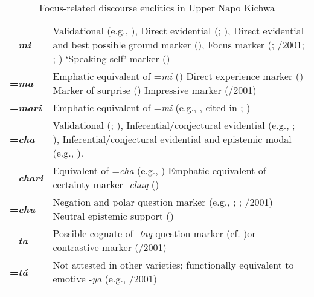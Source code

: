 \documentclass[output=paper]{langscibook}
\begin{document}
\begin{table}
\centering
\begin{tabularx}{\textwidth}{lQ}
\lsptoprule
\textbf{=\textit{mi}}
                        &	Validational (e.g., \citealt{Cole1982}),	\newline
				Direct evidential (\citealt{Weber1986}; \citealt{Floyd1997}), 	\newline
				Direct evidential and best possible ground marker (\citealt{Faller2002}),	\newline
				Focus marker (\citealt{Muysken1995}; \citealt{Cusihuaman1976}/2001; \citealt{Sanchez2010}; \citeyear{Sanchez2015})\newline
                            ‘Speaking self’ marker (\citealt{Nuckolls2012}) \\
\tablevspace
\textbf{=\textit{ma}}
                        &	Emphatic equivalent of =\textit{mi} (\citealt{Cole1982})	\newline
				Direct experience marker (\citealt{Hintz2017})	\newline
				Marker of surprise (\citealt{Faller2002})	\newline
				Impressive marker (\citealt{Cusihuaman1976}/2001)	\\
\tablevspace
\textbf{=\textit{mari}}	&	Emphatic equivalent of =\textit{mi} (e.g., \citealt{JakeChuquin1979}, cited in \citealt{Floyd1997}; \citealt{Faller2002})	\\
\tablevspace
\textbf{=\textit{cha}}	&	Validational (\citealt{Adelaar1977}; \citealt{Cole1982}), 	\newline
				Inferential/conjectural evidential (e.g., \citealt{Weber1986}; \citealt{Floyd1997}), 	\newline
				Inferential/conjectural evidential and  epistemic modal (e.g., \citealt{Faller2002}).	\\
\tablevspace
\textbf{=\textit{chari}}&	Equivalent of =\textit{cha} (e.g., \citealt{Cole1982})	\newline
                                Emphatic equivalent of certainty marker -\textit{chaq} (\citealt{Weber1989})\\

\tablevspace
\textbf{=\textit{chu}}	&	Negation and polar question marker (e.g., \citealt{Cole1982}; \citealt{Weber1989}; \citealt{Cusihuaman1976}/2001)	\newline
                                       Neutral epistemic support (\citealt{Boye2012})\\

\tablevspace
\textbf{=\textit{ta}}	&	Possible cognate of -\textit{taq} question marker (cf. \citealt{Weber1989})or contrastive marker (\citealt[]{Cusihuaman1976}/2001)	\\
\tablevspace
\textbf{=\textit{tá}}	&	Not attested in other varieties; functionally equivalent to emotive -\textit{ya} (e.g., \citealt{Cusihuaman1976}/2001)\\
\lspbottomrule
\end{tabularx}
\caption{Focus-related discourse enclitics in Upper Napo Kichwa}\label{tab:kg1}
\end{table}
\end{document}

